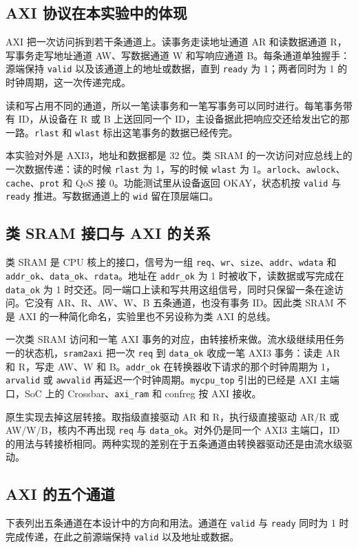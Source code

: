 \documentclass{article}
\begin{document}
\subsection{AXI 协议在本实验中的体现}
AXI 把一次访问拆到若干条通道上。读事务走读地址通道 AR 和读数据通道 R，写事务走写地址通道 AW、写数据通道 W 和写响应通道 B。每条通道单独握手：源端保持 \texttt{valid} 以及该通道上的地址或数据，直到 \texttt{ready} 为 1；两者同时为 1 的时钟周期，这一次传递完成。

读和写占用不同的通道，所以一笔读事务和一笔写事务可以同时进行。每笔事务带有 ID，从设备在 R 或 B 上送回同一个 ID，主设备据此把响应交还给发出它的那一路。\texttt{rlast} 和 \texttt{wlast} 标出这笔事务的数据已经传完。

本实验对外是 AXI3，地址和数据都是 32 位。类 SRAM 的一次访问对应总线上的一次数据传递：读的时候 \texttt{rlast} 为 1，写的时候 \texttt{wlast} 为 1。\texttt{arlock}、\texttt{awlock}、\texttt{cache}、\texttt{prot} 和 QoS 接 0。功能测试里从设备返回 OKAY，状态机按 \texttt{valid} 与 \texttt{ready} 推进。写数据通道上的 \texttt{wid} 留在顶层端口。

\subsection{类 SRAM 接口与 AXI 的关系}
类 SRAM 是 CPU 核上的接口，信号为一组 \texttt{req}、\texttt{wr}、\texttt{size}、\texttt{addr}、\texttt{wdata} 和 \texttt{addr\_ok}、\texttt{data\_ok}、\texttt{rdata}。地址在 \texttt{addr\_ok} 为 1 时被收下，读数据或写完成在 \texttt{data\_ok} 为 1 时交还。同一端口上读和写共用这组信号，同时只保留一条在途访问。它没有 AR、R、AW、W、B 五条通道，也没有事务 ID。因此类 SRAM 不是 AXI 的一种简化命名，实验里也不另设称为类 AXI 的总线。

一次类 SRAM 访问和一笔 AXI 事务的对应，由转接桥来做。流水级继续用任务一的状态机，\texttt{sram2axi} 把一次 \texttt{req} 到 \texttt{data\_ok} 收成一笔 AXI3 事务：读走 AR 和 R，写走 AW、W 和 B。\texttt{addr\_ok} 在转换器收下请求的那个时钟周期为 1，\texttt{arvalid} 或 \texttt{awvalid} 再延迟一个时钟周期。\texttt{mycpu\_top} 引出的已经是 AXI 主端口，SoC 上的 Crossbar、\texttt{axi\_ram} 和 confreg 按 AXI 接收。

原生实现去掉这层转接。取指级直接驱动 AR 和 R，执行级直接驱动 AR/R 或 AW/W/B，核内不再出现 \texttt{req} 与 \texttt{data\_ok}。对外仍是同一个 AXI3 主端口，ID 的用法与转接桥相同。两种实现的差别在于五条通道由转换器驱动还是由流水级驱动。

\subsection{AXI 的五个通道}
下表列出五条通道在本设计中的方向和用法。通道在 \texttt{valid} 与 \texttt{ready} 同时为 1 时完成传递，在此之前源端保持 \texttt{valid} 以及地址或数据。
\end{document}
